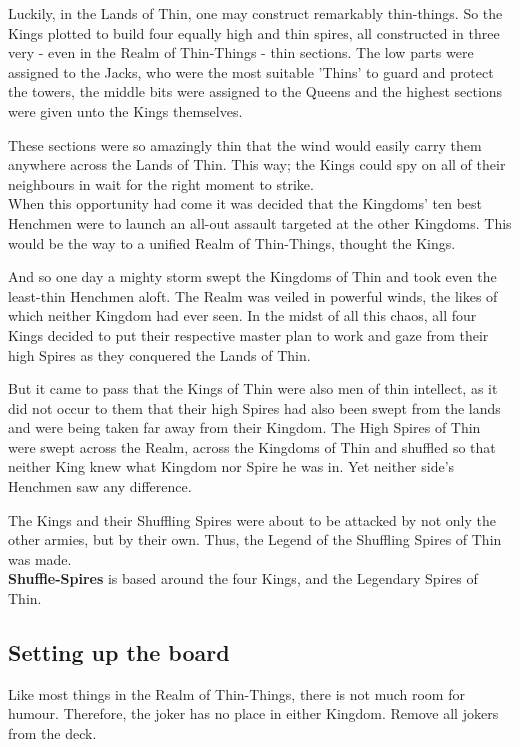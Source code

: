 \documentclass[11pt,twocolumn]{article}
\begin{document}
Luckily, in the Lands of Thin, one may construct remarkably thin-things.
So the Kings plotted to build four equally high and thin spires, all constructed in three very - even in the Realm of Thin-Things - thin sections.
The low parts were assigned to the Jacks, who were the most suitable 'Thins' to guard and protect the towers, the middle bits were assigned to the Queens and the highest sections were given unto the Kings themselves.

These sections were so amazingly thin that the wind would easily carry them anywhere across the Lands of Thin. This way; the Kings could spy on all of their neighbours in wait for the right moment to strike.\\

\noindent
When this opportunity had come it was decided that the Kingdoms’ ten best Henchmen were to launch an all-out assault targeted at the other Kingdoms.
This would be the way to a unified Realm of Thin-Things, thought the Kings.

And so one day a mighty storm swept the Kingdoms of Thin and took even the least-thin Henchmen aloft.
The Realm was veiled in powerful winds, the likes of which neither Kingdom had ever seen. In the midst of all this chaos, all four Kings decided to put their respective master plan to work and gaze from their high Spires as they conquered the Lands of Thin.

But it came to pass that the Kings of Thin were also men of thin intellect, as it did not occur to them that their high Spires had also been swept from the lands and were being taken far away from their Kingdom. The High Spires of Thin were swept across the Realm, across the Kingdoms of Thin and shuffled so that neither King knew what Kingdom nor Spire he was in.
Yet neither side's Henchmen saw any difference.

The Kings and their Shuffling Spires were about to be attacked by not only the other armies, but by their own.
Thus, the Legend of the Shuffling Spires of Thin was made. \\

\noindent
\textbf{Shuffle-Spires} is based around the four Kings, and the Legendary Spires of Thin.

\subsection{Setting up the board}
\label{sec:settinguptheboard}
Like most things in the Realm of Thin-Things, there is not much room for humour.
Therefore, the joker has no place in either Kingdom.
Remove all jokers from the deck.\\
\end{document}

